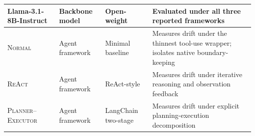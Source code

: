 \begin{table}[t]
\begin{tabularx}{\linewidth}{p{4.5cm}p{2.2cm}p{2cm}X}
Llama-3.1-8B-Instruct~\citep{grattafiori2024llama} & Backbone model & Open-weight & Evaluated under all three reported frameworks \\
\midrule
\textsc{Normal} & Agent framework & Minimal baseline & Measures drift under the thinnest tool-use wrapper; isolates native boundary-keeping \\
\textsc{ReAct}~\citep{yao2022react} & Agent framework & ReAct-style & Measures drift under iterative reasoning and observation feedback \\
\textsc{Planner--Executor}~\citep{wang2023plan,Chase_LangChain_2022} & Agent framework & LangChain two-stage & Measures drift under explicit planning-execution decomposition \\
\bottomrule
\end{tabularx}
\end{table}